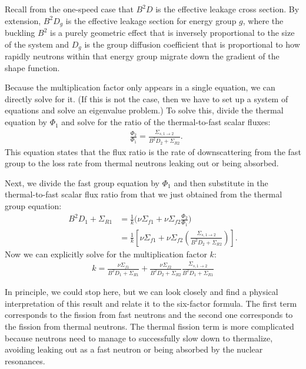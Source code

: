 Recall from the one-speed case that $B^2 D$ is the effective leakage cross section. By extension, $B^2 D_g$ is the effective leakage section for energy group $g$, where the buckling $B^2$ is a purely geometric effect that is inversely proportional to the size of the system and $D_g$ is the group diffusion coefficient that is proportional to how rapidly neutrons within that energy group migrate down the gradient of the shape function.

Because the multiplication factor only appears in a single equation, we can directly solve for it. (If this is not the case, then we have to set up a system of equations and solve an eigenvalue problem.) To solve this, divide the thermal equation by $\Phi_1$ and solve for the ratio of the thermal-to-fast scalar fluxes:
\begin{align}
  &\frac{\Phi_2}{\Phi_1}  = \frac{ \Sigma_{s,1\rightarrow 2} }{ B^2 D_2  + \Sigma_{R2} }  .
\end{align}
This equation states that the flux ratio is the rate of downscattering from the fast group to the loss rate from thermal neutrons leaking out or being absorbed. 

Next, we divide the fast group equation by $\Phi_1$ and then substitute in the thermal-to-fast scalar flux ratio from that we just obtained from the thermal group equation: 
\begin{align}
  B^2 D_1   + \Sigma_{R1}  
  &= \frac{1}{k} \bigg( \nu\Sigma_{f1}  + \nu\Sigma_{f2} \frac{\Phi_2}{\Phi_1} \bigg) \nonumber \\
  &= \frac{1}{k} \left[ \nu\Sigma_{f1}  + \nu\Sigma_{f2} \left( \frac{ \Sigma_{s,1\rightarrow 2} }{ B^2 D_2  + \Sigma_{R2} } \right) \right] .
\end{align}
Now we can explicitly solve for the multiplication factor $k$:
\begin{align}
  k = \frac{ \nu\Sigma_{f1} }{ B^2 D_1 + \Sigma_{R1} } + \frac{ \nu\Sigma_{f2} }{ B^2 D_2 + \Sigma_{R2} } \frac{ \Sigma_{s,1\rightarrow 2} }{ B^2 D_1  + \Sigma_{R1} }
\end{align}

In principle, we could stop here, but we can look closely and find a physical interpretation of this result and relate it to the six-factor formula. The first term corresponds to the fission from fast neutrons and the second one corresponds to the fission from thermal neutrons. The thermal fission term is more complicated because neutrons need to manage to successfully slow down to thermalize, avoiding leaking out as a fast neutron or being absorbed by the nuclear resonances.

